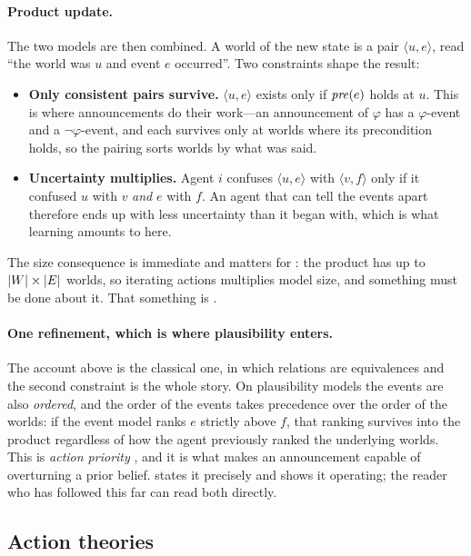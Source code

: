 \documentclass[11pt,a4paper]{article}
\begin{document}
\paragraph{Product update.}
The two models are then combined. A world of the new state is a pair $\langle u, e\rangle$,
read ``the world was $u$ and event $e$ occurred''. Two constraints shape the result:

\begin{itemize}
  \item \textbf{Only consistent pairs survive.} $\langle u,e\rangle$ exists only if
    $\mathit{pre}(e)$ holds at $u$. This is where announcements do their work---an announcement of
    $\varphi$ has a $\varphi$-event and a $\neg\varphi$-event, and each survives only at
    worlds where its precondition holds, so the pairing sorts worlds by what was said.
  \item \textbf{Uncertainty multiplies.} Agent $i$ confuses $\langle u,e\rangle$ with
    $\langle v,f\rangle$ only if it confused $u$ with $v$ \emph{and} $e$ with $f$. An agent
    that can tell the events apart therefore ends up with less uncertainty than it began
    with, which is what learning amounts to here.
\end{itemize}

The size consequence is immediate and matters for : the product has up to
$|W| \times |E|$ worlds, so iterating actions multiplies model size, and something must
be done about it. That something is .

\paragraph{One refinement, which is where plausibility enters.}
The account above is the classical one, in which relations are equivalences and the second
constraint is the whole story. On plausibility models the events are also \emph{ordered}, and
the order of the events takes precedence over the order of the worlds: if the event model
ranks $e$ strictly above $f$, that ranking survives into the product regardless of how the
agent previously ranked the underlying worlds. This is \emph{action priority}
\citep{baltag2008}, and it is what makes an announcement capable of overturning a prior
belief.  states it precisely and  shows it operating; the
reader who has followed this far can read both directly.

\subsection{Action theories}
\end{document}
